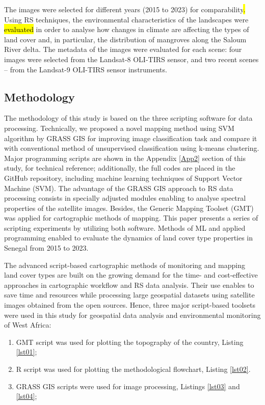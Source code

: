 \documentclass[earth,article,submit,pdftex,moreauthors]{Definitions/mdpi}
\begin{document}
{The} images were selected for different years (2015 to 2023)\hl{ }for comparability\hl{. }{Using RS techniques,} the environmental {characteristics} of the landscapes were \hl{evaluated} in order to analyse how changes in climate are affecting the types of land cover and{, in particular, the} distribution of mangroves along the {Saloum River delta.} The {metadata of the}\hl{ }images were evaluated for each scene: four images were selected from the Landsat-8 {OLI-TIRS sensor}, and two recent scenes -- from the Landsat-9 {OLI-TIRS sensor instruments}. 

\subsection{Methodology}

The methodology of this study {is based on the} three scripting software for data processing{. Technically, we proposed a novel mapping method using SVM algorithm by GRASS GIS for improving image classification task and compare it with conventional method of unsupervised classification using k-means clustering. Major }programming scripts {are} shown in the Appendix \ref{App2} section of this study, for technical reference{; additionally, the full codes are placed in the GitHub repository, including machine learning techniques of Support Vector Machine (SVM)}. {The} advantage of the GRASS GIS approach {to RS data processing consists in} specially adjusted modules {enabling }to analyse{ }spectral properties of the {satellite }images{. Besides, the Generic Mapping Toolset (}GMT) {was applied for }cartographic methods of mapping{. This paper presents a series of scripting experiments by utilizing both software. Methods of ML and applied programming enabled to evaluate the dynamics of} land cover type properties in Senegal from 2015 to 2023. 

The advanced script-based cartographic methods of monitoring and mapping land cover types are built on the growing demand for the time- and cost-effective approaches in cartographic workflow and {RS} data analysis{. Their use enables} to save time and resources while processing {large }geospatial datasets{ using }satellite images {obtained from the open sources}. Hence, three major script-based toolsets were used in this study for geospatial data analysis and environmental monitoring of West Africa:

 \begin{enumerate}
        \item GMT script was used for plotting the topography of the country, Listing \ref{lst01};  
        \item R script was used for plotting the methodological flowchart, Listing \ref{lst02}. 
         \item GRASS GIS {scripts were} used for image processing, {Listings} \ref{lst03} and \ref{lst04}; 
  \end{enumerate}       
\end{document}
